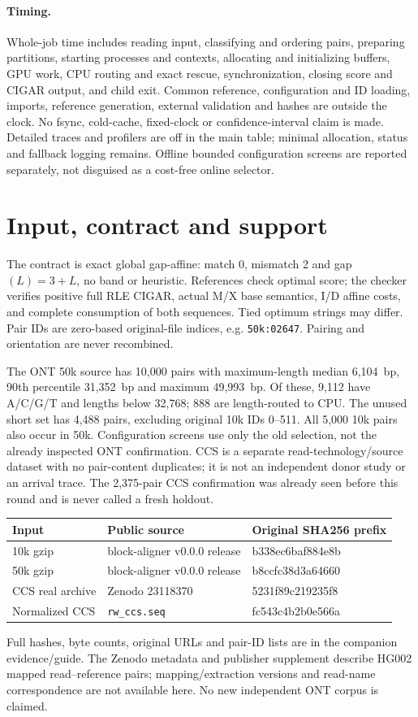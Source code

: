 \documentclass[11pt,a4paper]{article}
\begin{document}
\paragraph{Timing.} Whole-job time includes reading input, classifying and ordering pairs, preparing partitions, starting processes and contexts, allocating and initializing buffers, GPU work, CPU routing and exact rescue, synchronization, closing score and CIGAR output, and child exit. Common reference, configuration and ID loading, imports, reference generation, external validation and hashes are outside the clock. No fsync, cold-cache, fixed-clock or confidence-interval claim is made. Detailed traces and profilers are off in the main table; minimal allocation, status and fallback logging remains. Offline bounded configuration screens are reported separately, not disguised as a cost-free online selector.

\section{Input, contract and support}
The contract is exact global gap-affine: match 0, mismatch 2 and gap$(L)=3+L$, no band or heuristic. References check optimal score; the checker verifies positive full RLE CIGAR, actual M/X base semantics, I/D affine costs, and complete consumption of both sequences. Tied optimum strings may differ. Pair IDs are zero-based original-file indices, e.g. \texttt{50k:02647}. Pairing and orientation are never recombined.

The ONT 50k source has 10,000 pairs with maximum-length median 6,104~bp, 90th percentile 31,352~bp and maximum 49,993~bp. Of these, 9,112 have A/C/G/T and lengths below 32,768; 888 are length-routed to CPU. The unused short set has 4,488 pairs, excluding original 10k IDs 0--511. All 5,000 10k pairs also occur in 50k. Configuration screens use only the old selection, not the already inspected ONT confirmation. CCS is a separate read-technology/source dataset with no pair-content duplicates; it is not an independent donor study or an arrival trace. The 2,375-pair CCS confirmation was already seen before this round and is never called a fresh holdout.

\begin{center}\small\begin{tabular}{lll}\toprule
Input & Public source & Original SHA256 prefix\\\midrule
10k gzip & block-aligner v0.0.0 release & b338ec6baf884e8b\\
50k gzip & block-aligner v0.0.0 release & b8ccfc38d3a64660\\
CCS real archive & Zenodo 23118370 & 5231f89c219235f8\\
Normalized CCS & \texttt{rw\_ccs.seq} & fc543c4b2b0e566a\\\bottomrule\end{tabular}\end{center}
Full hashes, byte counts, original URLs and pair-ID lists are in the companion evidence/guide. The Zenodo metadata and publisher supplement describe HG002 mapped read--reference pairs; mapping/extraction versions and read-name correspondence are not available here. No new independent ONT corpus is claimed.
\end{document}
